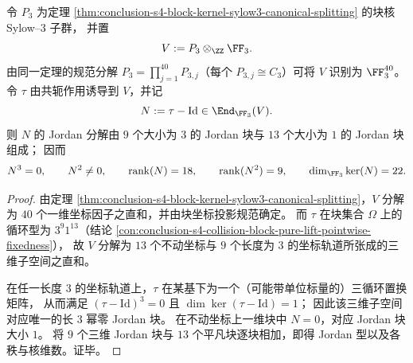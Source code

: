 \begin{conclusion}\label{con:conclusion-s4-collision-tau-jordan-type-on-P3}
令 \(P_3\) 为定理 \ref{thm:conclusion-s4-block-kernel-sylow3-canonical-splitting} 的块核 Sylow--\(3\) 子群，
并置
\[
V:=P_3\otimes_{\ZZ}\FF_3.
\]
由同一定理的规范分解 \(P_3=\prod_{j=1}^{40}P_{3,j}\)（每个 \(P_{3,j}\cong C_3\)）可将 \(V\) 识别为 \(\FF_3^{40}\)。
令 \(\tau\) 由共轭作用诱导到 \(V\)，并记
\[
N:=\tau-\mathrm{Id}\in \End_{\FF_3}(V).
\]
则 \(N\) 的 Jordan 分解由 \(9\) 个大小为 \(3\) 的 Jordan 块与 \(13\) 个大小为 \(1\) 的 Jordan 块组成；
因而
\[
N^3=0,\qquad N^2\neq 0,\qquad
\operatorname{rank}(N)=18,\qquad
\operatorname{rank}(N^2)=9,\qquad
\dim_{\FF_3}\ker(N)=22.
\]
\end{conclusion}
\begin{proof}
由定理 \ref{thm:conclusion-s4-block-kernel-sylow3-canonical-splitting}，\(V\) 分解为 \(40\) 个一维坐标因子之直和，并由块坐标投影规范确定。
而 \(\tau\) 在块集合 \(\Omega\) 上的循环型为 \(3^{9}1^{13}\)（结论 \ref{con:conclusion-s4-collision-block-pure-lift-pointwise-fixedness}），
故 \(V\) 分解为 \(13\) 个不动坐标与 \(9\) 个长度为 \(3\) 的坐标轨道所张成的三维子空间之直和。
\par
在任一长度 \(3\) 的坐标轨道上，\(\tau\) 在某基下为一个（可能带单位标量的）三循环置换矩阵，
从而满足 \((\tau-\mathrm{Id})^3=0\) 且 \(\dim\ker(\tau-\mathrm{Id})=1\)；
因此该三维子空间对应唯一的长 \(3\) 幂零 Jordan 块。
在不动坐标上一维块中 \(N=0\)，对应 Jordan 块大小 \(1\)。
将 \(9\) 个三维 Jordan 块与 \(13\) 个平凡块逐块相加，即得 Jordan 型以及各秩与核维数。证毕。
\end{proof}

